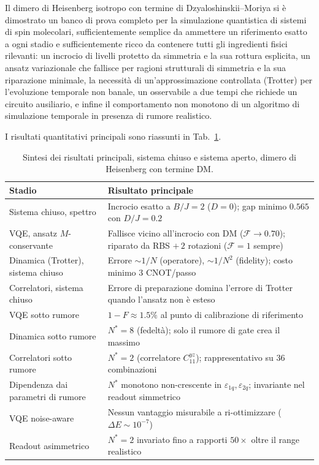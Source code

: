 \documentclass[11pt,a4paper]{article}
\begin{document}
Il dimero di Heisenberg isotropo con termine di Dzyaloshinskii--Moriya si
è dimostrato un banco di prova completo per la simulazione quantistica di
sistemi di spin molecolari, sufficientemente semplice da ammettere un
riferimento esatto a ogni stadio e sufficientemente ricco da contenere
tutti gli ingredienti fisici rilevanti: un incrocio di livelli protetto da
simmetria e la sua rottura esplicita, un ansatz variazionale che fallisce
per ragioni strutturali di simmetria e la sua riparazione minimale, la
necessità di un'approssimazione controllata (Trotter) per l'evoluzione
temporale non banale, un osservabile a due tempi che richiede un circuito
ausiliario, e infine il comportamento non monotono di un algoritmo di
simulazione temporale in presenza di rumore realistico.

I risultati quantitativi principali sono riassunti in Tab.~\ref{tab:sintesi}.

\begin{table}[htbp]
\centering
\renewcommand{\arraystretch}{1.35}
\small
\begin{tabular}{@{}p{4.6cm}p{10.5cm}@{}}
\toprule
Stadio & Risultato principale \\
\midrule
Sistema chiuso, spettro & Incrocio esatto a $B/J=2$ ($D=0$); gap minimo $0.565$ con $D/J=0.2$ \\
VQE, ansatz $M$-conservante & Fallisce vicino all'incrocio con DM ($\mathcal F\to0.70$); riparato da RBS $+\,2$ rotazioni ($\mathcal F=1$ sempre) \\
Dinamica (Trotter), sistema chiuso & Errore $\sim1/N$ (operatore), $\sim1/N^2$ (fidelity); costo minimo $3$ CNOT/passo \\
Correlatori, sistema chiuso & Errore di preparazione domina l'errore di Trotter quando l'ansatz non è esteso \\
VQE sotto rumore & $1-F\approx1.5\%$ al punto di calibrazione di riferimento \\
Dinamica sotto rumore & $N^*=8$ (fedeltà); solo il rumore di gate crea il massimo \\
Correlatori sotto rumore & $N^*=2$ (correlatore $C_{11}^{yz}$); rappresentativo su 36 combinazioni \\
Dipendenza dai parametri di rumore & $N^*$ monotono non-crescente in $\varepsilon_{1q},\varepsilon_{2q}$; invariante nel readout simmetrico \\
VQE noise-aware & Nessun vantaggio misurabile a ri-ottimizzare ($\Delta E\sim10^{-7}$) \\
Readout asimmetrico & $N^*=2$ invariato fino a rapporti $50\times$ oltre il range realistico \\
\bottomrule
\end{tabular}
\caption{Sintesi dei risultati principali, sistema chiuso e sistema
aperto, dimero di Heisenberg con termine DM.}
\label{tab:sintesi}
\end{table}
\end{document}
